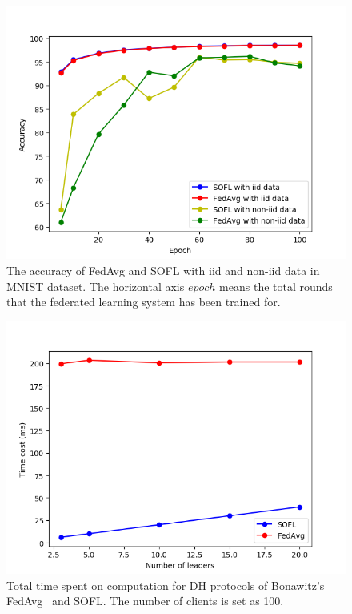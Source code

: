 \begin{figure}[!ht]
    \centering
    \includegraphics[width=\columnwidth]{img/acc.png}
    \caption{The accuracy of FedAvg and SOFL with iid and non-iid data in MNIST dataset. The horizontal axis $epoch$ means the total rounds that the federated learning system has been trained for.}
    \label{acc}
\end{figure}

\begin{figure}[!ht]
    \centering
    \includegraphics[width=\columnwidth]{img/leader-time.png}
    \caption{Total time spent on computation for DH protocols of Bonawitz's FedAvg~\cite{Practical} and SOFL. The number of clients is set as 100.}
    \label{leader-time}
\end{figure}

